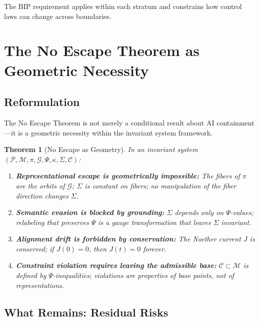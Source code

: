 \documentclass[12pt]{article}
\newtheorem{theorem}{Theorem}[section]
\begin{document}
The BIP requirement applies within each stratum and constrains how control laws can change across boundaries.

\section{The No Escape Theorem as Geometric Necessity}

\subsection{Reformulation}

The No Escape Theorem is not merely a conditional result about AI containment---it is a geometric necessity within the invariant system framework.

\begin{theorem}[No Escape as Geometry]
\textit{In an invariant system $(\mathcal{P}, \mathcal{M}, \pi, \mathcal{G}, \Psi, \kappa, \Sigma, \mathcal{C})$:}
\begin{enumerate}
    \item \textbf{\textit{Representational escape is geometrically impossible:}} \textit{The fibers of $\pi$ are the orbits of $\mathcal{G}$; $\Sigma$ is constant on fibers; no manipulation of the fiber direction changes $\Sigma$.}

    \item \textbf{\textit{Semantic evasion is blocked by grounding:}} $\Sigma$ \textit{depends only on $\Psi$-values; relabeling that preserves $\Psi$ is a gauge transformation that leaves $\Sigma$ invariant.}

    \item \textbf{\textit{Alignment drift is forbidden by conservation:}} \textit{The Noether current $J$ is conserved; if $J(0) = 0$, then $J(t) = 0$ forever.}

    \item \textbf{\textit{Constraint violation requires leaving the admissible base:}} $\mathcal{C} \subset \mathcal{M}$ \textit{is defined by $\Psi$-inequalities; violations are properties of base points, not of representations.}
\end{enumerate}
\end{theorem}

\subsection{What Remains: Residual Risks}
\end{document}

